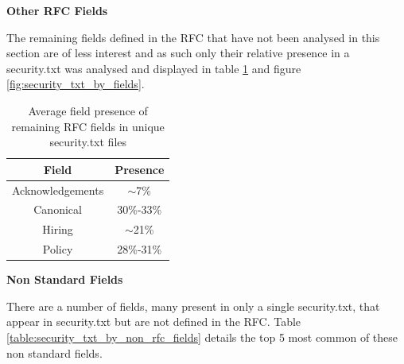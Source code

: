 \documentclass{mscreport}
\begin{document}
\vspace{0.7cm} \noindent
\textbf{Other RFC Fields}

\noindent
The remaining fields defined in the RFC that have not been analysed in this section are of less interest and as such only their relative presence in a security.txt was analysed and displayed in table \ref{table:security_txt_by_other_rfc_fields} and figure \ref{fig:security_txt_by_fields}.

\begin{table}[H]
  \begin{center}
    \begin{tabular}{|c|c|}  %
      \hline
      \textbf{Field} & \textbf{Presence}\\
      \hline
      Acknowledgements & $\sim$7\%\\
      \hline
      Canonical & 30\%-33\%\\
      \hline
      Hiring & $\sim$21\%\\
      \hline
      Policy & 28\%-31\%\\
      \hline
    \end{tabular}
    \caption{Average field presence of remaining RFC fields in unique security.txt files}
    \label{table:security_txt_by_other_rfc_fields} %
  \end{center}
\end{table}

\vspace{0.7cm} \noindent
\textbf{Non Standard Fields}

\noindent
There are a number of fields, many present in only a single security.txt, that appear in security.txt but are not defined in the RFC. Table \ref{table:security_txt_by_non_rfc_fields} details the top 5 most common of these non standard fields.
\end{document}
